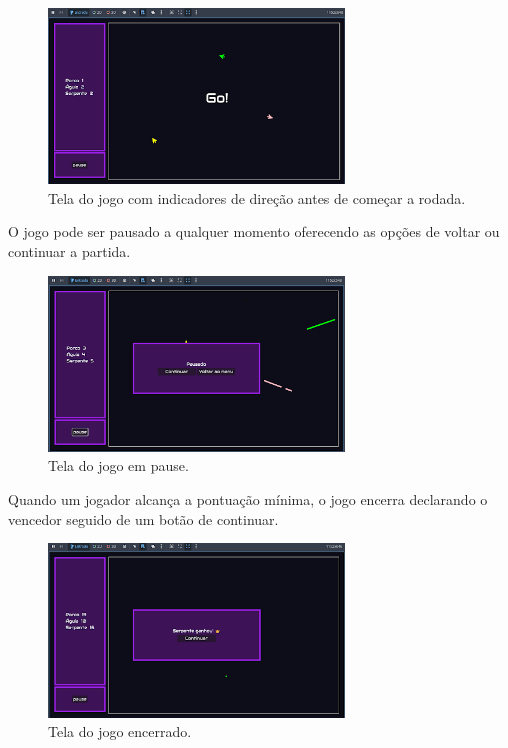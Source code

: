 \begin{figure}[htbp]
    \centering
    \caption{Tela do jogo com indicadores de direção antes de começar a rodada.}
    \label{fig:in-game}
    \includegraphics[width=0.7\textwidth]{figuras/in-game.png}
\end{figure}

O jogo pode ser pausado a qualquer momento oferecendo as opções de voltar ou continuar a partida.

\begin{figure}[htbp]
    \centering
    \caption{Tela do jogo em pause.}
    \label{fig:pause-game}
    \includegraphics[width=0.7\textwidth]{figuras/pause-menu.png}
\end{figure}

Quando um jogador alcança a pontuação mínima, o jogo encerra declarando o vencedor seguido de um botão de continuar.

\begin{figure}[htbp]
    \centering
    \caption{Tela do jogo encerrado.}
    \label{fig:fim-do-game}
    \includegraphics[width=0.7\textwidth]{figuras/win-game.png}
\end{figure}

